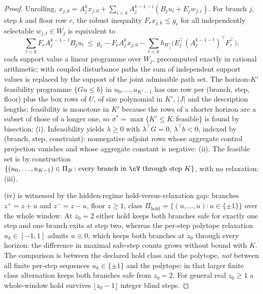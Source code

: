 \begin{proof}
Unrolling, $x_{j,k}=A_j^kx_{j,0}+\sum_{i<k}A_j^{k-1-i}(B_ju_i+E_jw_{j,i})$. For branch $j$, step $k$ and floor row $r$, the robust inequality $F_rx_{j,k}\le g_r$ for all independently selectable $w_{j,t}\in W_j$ is equivalent to
\[
\sum_{t<k}F_rA_j^{k-1-t}B_ju_t\ \le\ g_r-F_rA_j^kx_{j,0}-\sum_{t<k}h_{W_j}\bigl(E_j^\top(A_j^{k-1-t})^\top F_r^\top\bigr),
\]
each support value a linear programme over $W_j$, precomputed exactly in rational arithmetic; with coupled disturbance paths the sum of independent support values is replaced by the support of the joint admissible path set. The horizon-$K'$ feasibility programme $\{Gu\le b\}$ in $u_0,\dots,u_{K'-1}$ has one row per (branch, step, floor) plus the box rows of $U$, of size polynomial in $K'$, $|J|$ and the description lengths; feasibility is monotone in $K'$ because the rows of a shorter horizon are a subset of those of a longer one, so $\sigma^*=\max\{K'\le K:\text{feasible}\}$ is found by bisection: (i). Infeasibility yields $\lambda\ge0$ with $\lambda^\top G=0$, $\lambda^\top b<0$, indexed by (branch, step, constraint): nonnegative adjoint rows whose aggregate control projection vanishes and whose aggregate constant is negative: (ii). The feasible set is by construction $\{(u_0,\dots,u_{K-1})\in\Pi_B:\text{every branch in }\cV\text{ through step }K\}$, with no relaxation: (iii).

(iv) is witnessed by the hidden-regime hold-versus-relaxation gap: branches $z^+=z+u$ and $z^-=z-u$, floor $z\ge1$, class $\Pi_{\mathrm{hold}}=\{(u,\dots,u):u\in\{\pm1\}\}$ over the whole window. At $z_0=2$ either hold keeps both branches safe for exactly one step and one branch exits at step two, whereas the per-step polytope relaxation $u_k\in[-1,1]$ admits $u\equiv0$, which keeps both branches at $z_0$ through every horizon: the difference in maximal safe-step counts grows without bound with $K$. The comparison is between the declared hold class and the polytope, \emph{not} between all finite per-step sequences $u_k\in\{\pm1\}$ and the polytope: in that larger finite class alternation keeps both branches safe from $z_0=2$. For general real $z_0\ge1$ a whole-window hold survives $\lfloor z_0-1\rfloor$ integer blind steps.
\end{proof}

